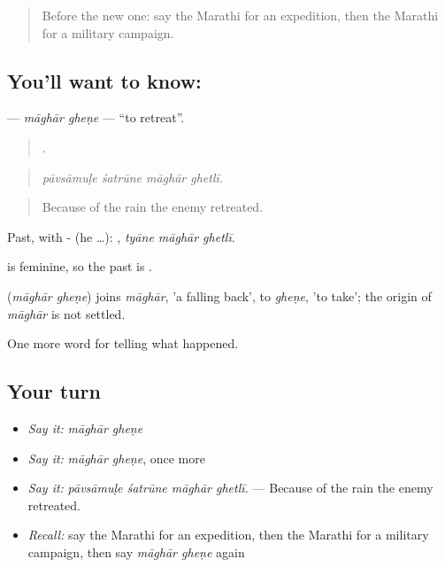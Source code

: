 \label{lesson:MR-C333-maghar-ghene}



\begin{quote}
Before the new one: say the Marathi for an expedition, then the Marathi for a military campaign.
\end{quote}

\subsection*{You'll want to know:  }
\textbf{ } — \emph{māghār gheṇe} — \textquotedblleft{}to retreat\textquotedblright{}.

\begin{quote}
   .
\end{quote}

\begin{quote}
\emph{pāvsāmuḷe śatrūne māghār ghetlī.}
\end{quote}

\begin{quote}
Because of the rain the enemy retreated.
\end{quote}

Past, with - (he …):   , \emph{tyāne māghār ghetlī}.

 is feminine, so the past is  .

\begin{cousinweb}
\textbf{ } (\emph{māghār gheṇe}) joins \emph{māghār}, 'a falling back', to \emph{gheṇe}, 'to take'; the origin of \emph{māghār} is not settled.
\end{cousinweb}

\begin{grammarlens}[title={What you've built}]
One more word for telling what happened.
\end{grammarlens}

\subsection*{Your turn}
\begin{itemize}
\raggedright
  \item \emph{Say it:} \emph{māghār gheṇe}
  \item \emph{Say it:} \emph{māghār gheṇe}, once more
  \item \emph{Say it:} \emph{pāvsāmuḷe śatrūne māghār ghetlī.} — Because of the rain the enemy retreated.
  \item \emph{Recall:} say the Marathi for an expedition, then the Marathi for a military campaign, then say \emph{māghār gheṇe} again
\end{itemize}

